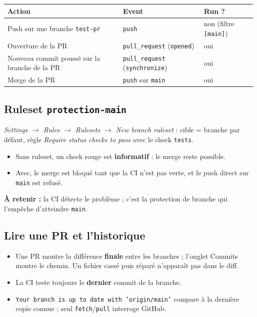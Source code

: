 \documentclass[11pt,a4paper]{article}
\newcommand{\retenir}[1]{\par\smallskip\noindent\colorbox{fondcode}{\parbox{\dimexpr\linewidth-2\fboxsep}{\textbf{\textcolor{bleu}{À retenir :}} #1}}\par\smallskip}
\newcommand{\cmd}[1]{\texttt{#1}}
\begin{document}
\begin{center}
\begin{tabularx}{\linewidth}{@{}X l l@{}}
\toprule
\textbf{Action} & \textbf{Event} & \textbf{Run ?} \\
\midrule
Push sur une branche \cmd{test-pr} & \cmd{push} & non (filtre \cmd{[main]}) \\
Ouverture de la PR & \cmd{pull\_request} (\cmd{opened}) & oui \\
Nouveau commit poussé sur la branche de la PR & \cmd{pull\_request} (\cmd{synchronize}) & oui \\
Merge de la PR & \cmd{push} sur \cmd{main} & oui \\
\bottomrule
\end{tabularx}
\end{center}

\subsection{Ruleset \texttt{protection-main}}
\emph{Settings $\rightarrow$ Rules $\rightarrow$ Rulesets $\rightarrow$ New branch ruleset} : cible = branche par défaut, règle \emph{Require status checks to pass} avec le check \cmd{tests}.
\begin{itemize}
  \item Sans ruleset, un check rouge est \textbf{informatif} : le merge reste possible.
  \item Avec, le merge est bloqué tant que la CI n'est pas verte, et le push direct sur \cmd{main} est refusé.
\end{itemize}
\retenir{la CI détecte le problème ; c'est la protection de branche qui l'empêche d'atteindre \cmd{main}.}

\subsection{Lire une PR et l'historique}
\begin{itemize}
  \item Une PR montre la différence \textbf{finale} entre les branches ; l'onglet Commits montre le chemin. Un fichier cassé puis réparé n'apparaît pas dans le diff.
  \item La CI teste toujours le \textbf{dernier} commit de la branche.
  \item \cmd{Your branch is up to date with 'origin/main'} compare à la dernière copie connue ; seul \cmd{fetch}/\cmd{pull} interroge GitHub.
\end{itemize}
\end{document}
